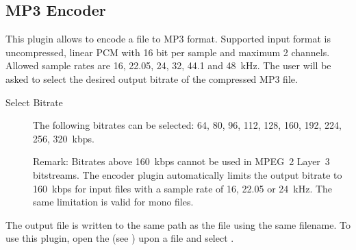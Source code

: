 \subsection{MP3 Encoder}
This plugin allows to encode a  file to MP3 format. Supported input 
format is uncompressed, linear PCM with 16 bit per sample and maximum 2 channels. 
Allowed sample rates are 16, 22.05, 24, 32, 44.1 and 48~kHz.
The user will be asked to select the desired output bitrate of the compressed
MP3 file. 

\begin{description}
\item[Select Bitrate] The following bitrates can be selected: 64, 80, 96, 112, 
128, 160, 192, 224, 256, 320~kbps.

Remark: Bitrates above 160~kbps cannot be used in MPEG~2 Layer~3 bitstreams. 
The encoder plugin automatically limits the output bitrate to 160~kbps for 
input files with a sample rate of 16, 22.05 or 24~kHz. The same limitation is 
valid for mono files.
\end{description}

The output  file is written to the same path as the  
file using the same filename. To use this plugin, open the  
(see ) upon a  file and select 
.

